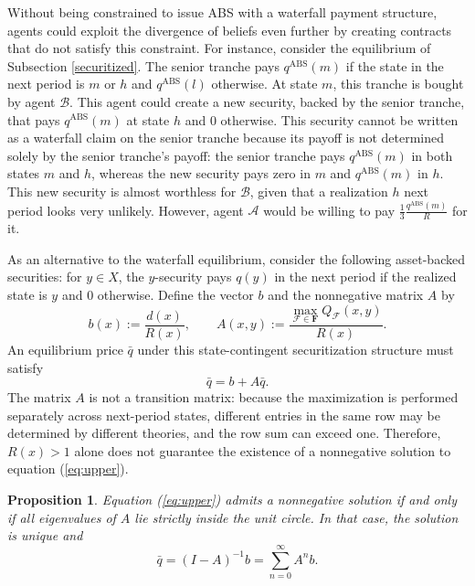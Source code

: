 \documentclass[11pt]{article}
\theoremstyle{plain}
\newtheorem{prp}{Proposition}%
\begin{document}
Without being constrained to issue ABS with a waterfall payment structure, agents could exploit the divergence of beliefs even further by creating contracts that do not satisfy this constraint. For instance, consider the equilibrium of Subsection \ref{securitized}. The senior tranche pays $q^{\mathrm{ABS}}(m)$ if the state in the next period is $m$ or $h$ and $q^{\mathrm{ABS}}(l)$ otherwise. At state $m$, this tranche is bought by agent $\mathcal{B}$. This agent could create a new security, backed by the senior tranche, that pays $q^{\mathrm{ABS}}(m)$ at state $h$ and 0 otherwise. This security cannot be written as a waterfall claim on the senior tranche because its payoff is not determined solely by the senior tranche's payoff: the senior tranche pays $q^{\mathrm{ABS}}(m)$ in both states $m$ and $h$, whereas the new security pays zero in $m$ and $q^{\mathrm{ABS}}(m)$ in $h$. This new security is almost worthless for $\mathcal{B}$, given that a realization $h$ next period looks very unlikely. However, agent $\mathcal{A}$ would be willing to pay $\frac{1}{3}\frac{q^{\mathrm{ABS}}(m)}{R}$ for it.

As an alternative to the waterfall equilibrium, consider the following asset-backed securities: for $y\in X$, the $y$-security pays $q(y)$ in the next period if the realized state is $y$ and 0 otherwise. Define the vector $b$ and the nonnegative matrix $A$ by
\[
b(x):=\frac{d(x)}{R(x)},
\qquad
A(x,y):=\frac{\max_{\mathcal{F}\in\mathbf{F}}Q_\mathcal{F}(x,y)}{R(x)}.
\]
An equilibrium price $\bar q$ under this state-contingent securitization structure must satisfy
\begin{equation} \label{eq:upper}
\bar q=b+A\bar q.
\end{equation}
The matrix $A$ is not a transition matrix: because the maximization is performed separately across next-period states, different entries in the same row may be determined by different theories, and the row sum can exceed one. Therefore, $R(x)>1$ alone does not guarantee the existence of a nonnegative solution to equation (\ref{eq:upper}).

\begin{prp}\label{prp:state-existence}
Equation (\ref{eq:upper}) admits a nonnegative solution if and only if all eigenvalues of $A$ lie strictly inside the unit circle. In that case, the solution is unique and
\[
\bar q=(I-A)^{-1}b=\sum_{n=0}^{\infty}A^n b.
\]
\end{prp}
\end{document}
